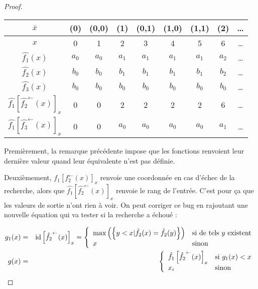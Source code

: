 \documentclass{report}
\newcommand{\eqpred}[3]{#1\left[ #2^{\leftarrow}(#3) \right]_{#3}}
\begin{document}
\begin{proof}
		\espace 
		
		\begin{center}
			\begin{tabular}{|c|cccccccc|}
				\hline
				$\bar{x}$			& (0)	& (0,0)	& (1)	& (0,1)	& (1,0)	& (1,1)	& (2)	& \dots \\
				\hline
				$x$					& 0 	& 1	 	& 2		& 3 	& 4 	& 5 	& 6 	& \dots \\
				\hline 
				$\hat{f_1}(x)$
									& $a_0$	& $a_0$	& $a_1$	& $a_1$	& $a_1$	& $a_1$	& $a_2$	& \dots \\
				$\hat{f_2}(x)$ 		
									& $b_0$	& $b_0$	& $b_1$	& $b_1$	& $b_1$	& $b_1$	& $b_2$	& \dots \\
				$\hat{f_3}(x)$ 		
									& $b_0$	& $b_0$	& $b_0$	& $b_0$	& $b_0$	& $b_0$	& $b_0$	& \dots \\
				$\eqpred{\hat{f_1}}{\hat{f_2}}{x}$
									& 0		& 0		& 2		& 2		& 2		& 2		& 6		& \dots \\
				$\eqpred{\hat{f_1}}{\hat{f_3}}{x}$
									& 0		& 0		& $a_0$ & $a_0$	& $a_0$	& $a_0$	& $a_1$	& \dots \\
				\hline
			\end{tabular}
		\end{center}
		
		Premièrement, la remarque précédente impose que les fonctions renvoient leur dernière valeur quand leur équivalente n'est pas définie. 
		
		Deuxièmement, $\eqpred{f_1}{f_2}{x}$ renvoie une coordonnée en cas d'échec de la recherche, alors que $\eqpred{\hat{f_1}}{\hat{f_2}}{x}$ renvoie le rang de l'entrée. C'est pour ça que les valeurs de sortie n'ont rien à voir. On peut corriger ce bug en rajoutant une nouvelle équation qui va tester si la recherche a échoué :
		
		\begin{eqnarray}
			g_1(x) 	& = 	& \eqpred{\text{id}}{\hat{f_2}}{x} = \casedist{
																		\maxset{y<x | \hat{f_2}(x) = \hat{f_2}(y)} & \text{si de tels $y$ existent}\\
																		x		& \text{sinon}
																		} \\
			g(x) & = & \casedist{
							\eqpred{\hat{f_1}}{\hat{f_2}}{x} & \text{si $g_1(x) < x$}\\
							x_i		& \text{sinon}
							}
		\end{eqnarray}
		

\end{proof}
\end{document}

